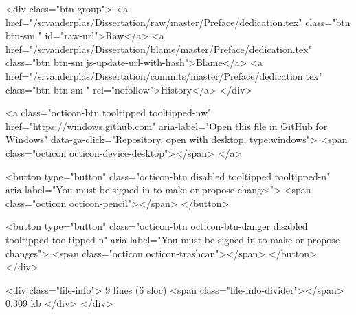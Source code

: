       <div class="btn-group">
        <a href="/srvanderplas/Dissertation/raw/master/Preface/dedication.tex" class="btn btn-sm " id="raw-url">Raw</a>
          <a href="/srvanderplas/Dissertation/blame/master/Preface/dedication.tex" class="btn btn-sm js-update-url-with-hash">Blame</a>
        <a href="/srvanderplas/Dissertation/commits/master/Preface/dedication.tex" class="btn btn-sm " rel="nofollow">History</a>
      </div>

        <a class="octicon-btn tooltipped tooltipped-nw"
           href="https://windows.github.com"
           aria-label="Open this file in GitHub for Windows"
           data-ga-click="Repository, open with desktop, type:windows">
            <span class="octicon octicon-device-desktop"></span>
        </a>

          <button type="button" class="octicon-btn disabled tooltipped tooltipped-n" aria-label="You must be signed in to make or propose changes">
            <span class="octicon octicon-pencil"></span>
          </button>

        <button type="button" class="octicon-btn octicon-btn-danger disabled tooltipped tooltipped-n" aria-label="You must be signed in to make or propose changes">
          <span class="octicon octicon-trashcan"></span>
        </button>
    </div>

    <div class="file-info">
        9 lines (6 sloc)
        <span class="file-info-divider"></span>
      0.309 kb
    </div>
  </div>
  
